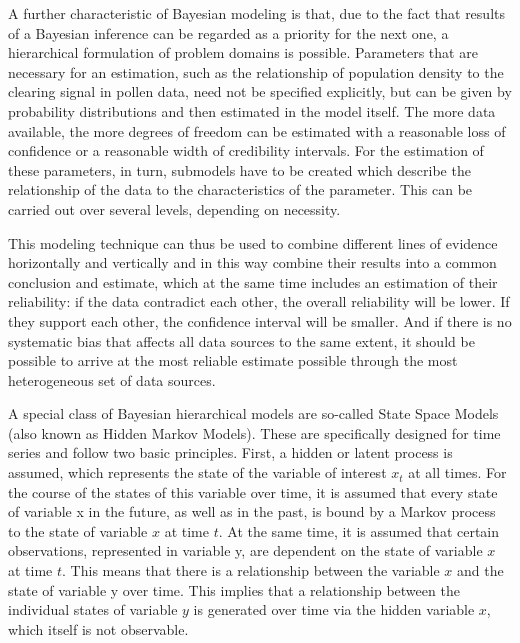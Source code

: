 \documentclass[
]{article}
\begin{document}
A further characteristic of Bayesian modeling is that, due to the fact that results of a Bayesian inference can be regarded as a priority for the next one, a hierarchical formulation of problem domains is possible. Parameters that are necessary for an estimation, such as the relationship of population density to the clearing signal in pollen data, need not be specified explicitly, but can be given by probability distributions and then estimated in the model itself. The more data available, the more degrees of freedom can be estimated with a reasonable loss of confidence or a reasonable width of credibility intervals. For the estimation of these parameters, in turn, submodels have to be created which describe the relationship of the data to the characteristics of the parameter. This can be carried out over several levels, depending on necessity.

This modeling technique can thus be used to combine different lines of evidence horizontally and vertically and in this way combine their results into a common conclusion and estimate, which at the same time includes an estimation of their reliability: if the data contradict each other, the overall reliability will be lower. If they support each other, the confidence interval will be smaller. And if there is no systematic bias that affects all data sources to the same extent, it should be possible to arrive at the most reliable estimate possible through the most heterogeneous set of data sources.

A special class of Bayesian hierarchical models are so-called State Space Models (also known as Hidden Markov Models). These are specifically designed for time series and follow two basic principles. First, a hidden or latent process is assumed, which represents the state of the variable of interest \(x_t\) at all times. For the course of the states of this variable over time, it is assumed that every state of variable x in the future, as well as in the past, is bound by a Markov process to the state of variable \(x\) at time \(t\). At the same time, it is assumed that certain observations, represented in variable y, are dependent on the state of variable \(x\) at time \(t\). This means that there is a relationship between the variable \(x\) and the state of variable y over time. This implies that a relationship between the individual states of variable \(y\) is generated over time via the hidden variable \(x\), which itself is not observable.
\end{document}
